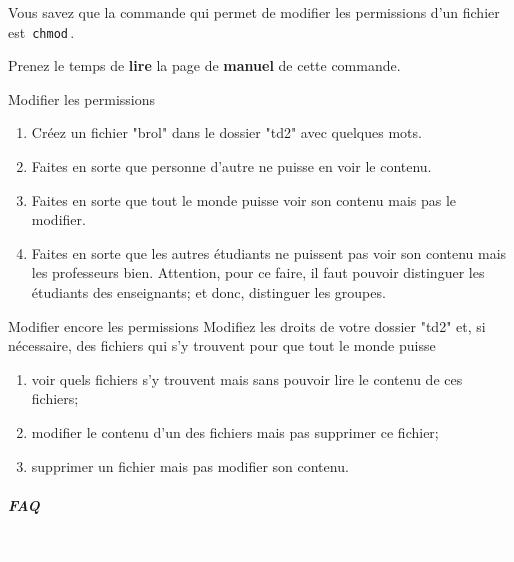\documentclass[a4paper,11pt]{style-esi/td}
\begin{document}
\par

Vous savez que la commande qui permet de modifier les permissions d'un fichier est 
\,\verb|chmod|\,.  

\par

Prenez le temps de \textbf{lire} 
la page de \textbf{manuel} de cette commande.   

\par
	
	\begin{Tutoriel}{Modifier les permissions} 
\begin{enumerate}	
	\item Créez un fichier "brol" dans le dossier "td2" avec quelques mots.
	\item Faites en sorte que personne d'autre ne puisse en voir le contenu.
	\item Faites en sorte que tout le monde puisse voir son contenu mais pas le modifier. 
	\item 
	Faites en sorte que les autres étudiants ne puissent pas voir son contenu mais les professeurs bien. 
	Attention, pour ce faire, il faut pouvoir distinguer les étudiants des enseignants; et donc, distinguer les groupes.
	
\end{enumerate}
		
	\end{Tutoriel}

	\begin{Tutoriel}{Modifier encore les permissions}           
Modifiez les droits de votre dossier "td2" et, si nécessaire, 
des fichiers qui s'y trouvent pour que tout le monde puisse  
\begin{enumerate}
	
	\item voir quels fichiers s'y trouvent mais sans pouvoir lire le contenu de ces fichiers;
	\item modifier le contenu d'un des fichiers mais pas supprimer ce fichier;
	\item supprimer un fichier mais pas modifier son contenu.
\end{enumerate}
	
\end{Tutoriel}


		\subparagraph{FAQ} 

\textcolor{white}{.} \par
\end{document}
